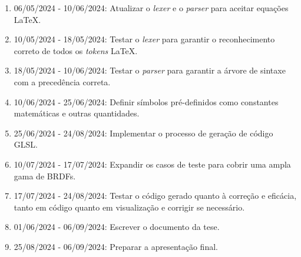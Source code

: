 \documentclass[english, 
               brazil, 
               bsc] %
               {dcomp-abntex2}
\begin{document}
\begin{enumerate} 
\item 06/05/2024 - 10/06/2024: Atualizar o \textit{lexer} e o \textit{parser} para aceitar equações \LaTeX.
\item 10/05/2024 - 18/05/2024: Testar o \textit{lexer} para garantir o reconhecimento correto de todos os \textit{tokens} \LaTeX .
\item 18/05/2024 - 10/06/2024: Testar o \textit{parser} para garantir a árvore de sintaxe com a precedência correta.
\item 10/06/2024 - 25/06/2024: Definir símbolos pré-definidos como constantes matemáticas e outras quantidades.
\item 25/06/2024 - 24/08/2024: Implementar o processo de geração de código GLSL.
\item 10/07/2024 - 17/07/2024: Expandir os casos de teste para cobrir uma ampla gama de BRDFs.
\item 17/07/2024 - 24/08/2024: Testar o código gerado quanto à correção e eficácia, tanto em código quanto em visualização e corrigir se necessário.
\item 01/06/2024 - 06/09/2024: Escrever o documento da tese.
\item 25/08/2024 - 06/09/2024: Preparar a apresentação final.
\end{enumerate}
\end{document}
